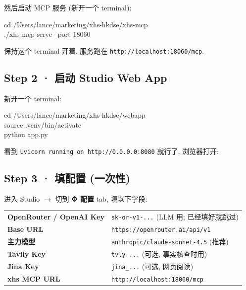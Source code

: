 \documentclass[11pt,a4paper]{article}
\begin{document}
然后启动 MCP 服务 (新开一个 terminal):

\begin{cmdbox}
cd /Users/lance/marketing/xhs-hkdse/xhs-mcp\\
./xhs-mcp serve --port 18060
\end{cmdbox}

\begin{tipbox}
保持这个 terminal 开着. 服务跑在 \texttt{http://localhost:18060/mcp}.
\end{tipbox}

\subsection{Step 2 · 启动 Studio Web App}

新开一个 terminal:

\begin{cmdbox}
cd /Users/lance/marketing/xhs-hkdse/webapp\\
source .venv/bin/activate\\
python app.py
\end{cmdbox}

看到 \texttt{Uvicorn running on http://0.0.0.0:8080} 就行了, 浏览器打开:

\begin{center}
\end{center}

\subsection{Step 3 · 填配置 (一次性)}

进入 Studio \(\to\) 切到 \textbf{⚙️ 配置} tab, 填以下字段:

\begin{tcolorbox}[colback=codeGray, colframe=gray!50, arc=2mm, breakable]
\footnotesize
\begin{tabular}{p{4cm} p{11cm}}
\textbf{OpenRouter / OpenAI Key} & \texttt{sk-or-v1-...} (LLM 用; 已经填好就跳过)\\[3pt]
\textbf{Base URL} & \texttt{https://openrouter.ai/api/v1}\\[3pt]
\textbf{主力模型} & \texttt{anthropic/claude-sonnet-4.5} (推荐)\\[3pt]
\textbf{Tavily Key} & \texttt{tvly-...} (可选, 事实核查时用)\\[3pt]
\textbf{Jina Key} & \texttt{jina\_...} (可选, 网页阅读)\\[3pt]
\textbf{xhs MCP URL} & \texttt{http://localhost:18060/mcp}\\
\end{tabular}
\end{tcolorbox}
\end{document}
